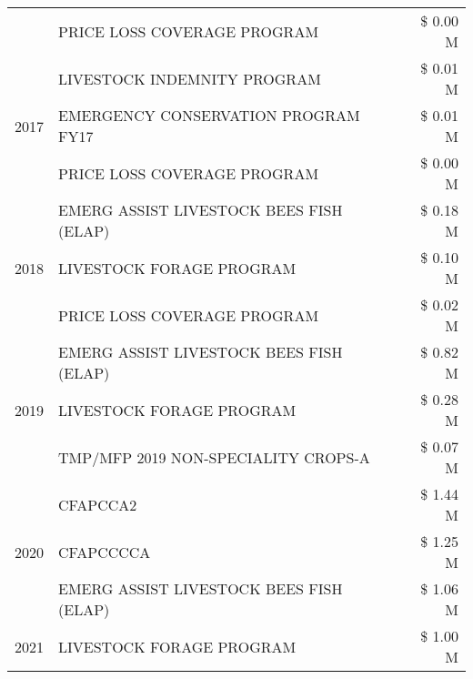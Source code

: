 \begin{tabular}{llr}
 & PRICE LOSS COVERAGE PROGRAM & \$ 0.00 M \\
\cline{1-3}
\multirow[t]{3}{*}{2017} & LIVESTOCK INDEMNITY PROGRAM & \$ 0.01 M \\
 & EMERGENCY CONSERVATION PROGRAM FY17 & \$ 0.01 M \\
 & PRICE LOSS COVERAGE PROGRAM & \$ 0.00 M \\
\cline{1-3}
\multirow[t]{3}{*}{2018} & EMERG ASSIST LIVESTOCK BEES FISH (ELAP) & \$ 0.18 M \\
 & LIVESTOCK FORAGE PROGRAM & \$ 0.10 M \\
 & PRICE LOSS COVERAGE PROGRAM & \$ 0.02 M \\
\cline{1-3}
\multirow[t]{3}{*}{2019} & EMERG ASSIST LIVESTOCK BEES FISH (ELAP) & \$ 0.82 M \\
 & LIVESTOCK FORAGE PROGRAM & \$ 0.28 M \\
 & TMP/MFP 2019 NON-SPECIALITY CROPS-A & \$ 0.07 M \\
\cline{1-3}
\multirow[t]{3}{*}{2020} & CFAPCCA2 & \$ 1.44 M \\
 & CFAPCCCCA & \$ 1.25 M \\
 & EMERG ASSIST LIVESTOCK BEES FISH (ELAP) & \$ 1.06 M \\
\cline{1-3}
2021 & LIVESTOCK FORAGE PROGRAM & \$ 1.00 M \\
\cline{1-3}
\bottomrule
\end{tabular}
